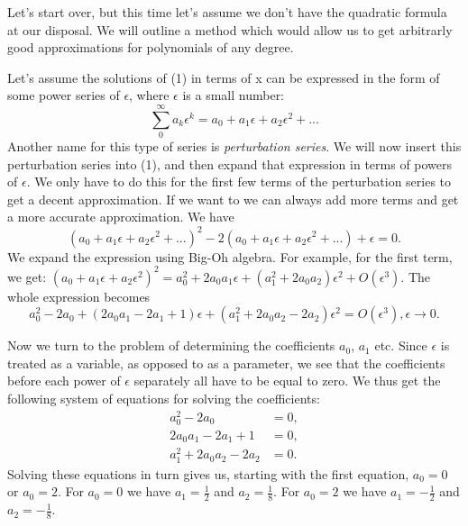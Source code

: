 \documentclass[12pt]{article}
\begin{document}
Let's start over, but this time let's assume we don't have the
quadratic formula at our disposal. We will outline a method which
would allow us to get arbitrarly good approximations for polynomials
of any degree.

Let's assume the solutions of (1) in terms of x can be expressed in
the form of some power series of $\epsilon$, where $\epsilon$ is a
small number:
\begin{equation}
\sum_0^{\infty} a_k \epsilon^k = a_0 + a_1 \epsilon + a_2 \epsilon^2 + ...
\end{equation}
Another name for this type of series is \textit{perturbation series}.
We will now insert this perturbation series into (1), and then expand that
expression in terms of powers of $\epsilon$. We only have to do this
for the first few terms of the perturbation series to get a decent
approximation. If we want to we can always add more terms and get a
more accurate approximation. We have
\begin{equation}
(a_0 + a_1 \epsilon + a_2 \epsilon^2 + ...)^2 - 2(a_0 + a_1 \epsilon + a_2
\epsilon^2 + ...) + \epsilon = 0.
\end{equation}
We expand the expression using Big-Oh algebra. For example, for the
first term, we get: $(a_0 + a_1 \epsilon + a_2 \epsilon^2)^2 = a_0^2 +
2 a_0 a_1 \epsilon + (a_1^2 + 2 a_0 a_2) \epsilon^2 + O(\epsilon^3)$.
The whole expression becomes
\begin{equation}
a_0^2 - 2 a_0 + (2 a_0 a_1 - 2 a_1 + 1)\epsilon + (a_1^2 + 2 a_0 a_2 - 2 a_2)
\epsilon^2 = O(\epsilon^3), \epsilon \to 0.
\end{equation}

Now we turn to the problem of determining the coefficients $a_0$,
$a_1$ etc. Since $\epsilon$ is treated as a variable, as opposed to as
a parameter, we see that the coefficients before each power of
$\epsilon$ separately all have to be equal to zero. We thus get the
following system of equations for solving the coefficients:
\begin{align}
a_0^2 - 2 a_0 &=0, \\
2 a_0 a_1 - 2 a_1 + 1 &= 0, \\
a_1^2 + 2 a_0 a_2 - 2 a_2 &= 0.
\end{align}
Solving these equations in turn gives us, starting with the first
equation, $a_0 = 0$ or $a_0 = 2$. For $a_0 = 0$ we have $a_1 =
\frac{1}{2}$ and $a_2 = \frac{1}{8}$. For $a_0 = 2$ we have $a_1 = -
\frac{1}{2}$ and $a_2 = - \frac{1}{8}$.
\end{document}
